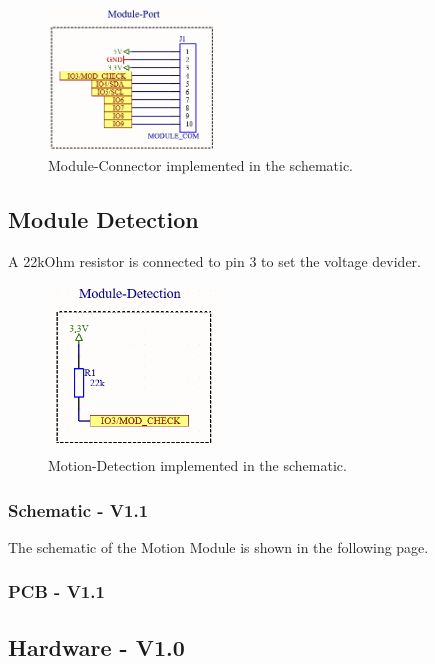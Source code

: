             \begin{figure}[H]
                \centering
                \includegraphics[width=0.4\textwidth]{assets/HW/Motion-Module-Port.png}
                \caption{Module-Connector implemented in the schematic.}
            \end{figure}

        \subsection{Module Detection}
            A 22kOhm resistor is connected to pin 3 to set the voltage devider.

            \begin{figure}[H]
                \centering
                \includegraphics[width=0.4\textwidth]{assets/HW/Motion-Module-Check.png}
                \caption{Motion-Detection implemented in the schematic.}
            \end{figure}

        \subsubsection{Schematic - V1.1}
            The schematic of the Motion Module is shown in the following page.
            


        \subsubsection{PCB - V1.1}    
        
        
    \subsection {Hardware - V1.0}